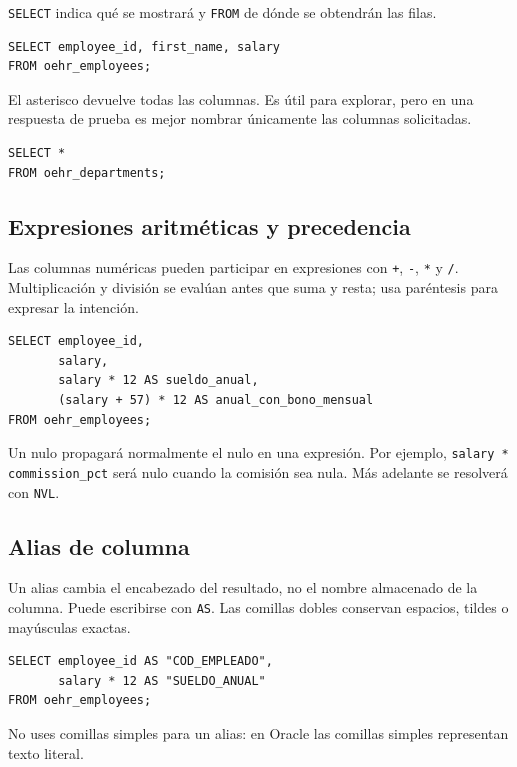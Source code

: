 \documentclass[11pt,a4paper]{article}
\newcommand{\campo}[1]{\texttt{#1}}
\begin{document}
\campo{SELECT} indica qué se mostrará y \campo{FROM} de dónde se obtendrán las filas.

\begin{lstlisting}
SELECT employee_id, first_name, salary
FROM oehr_employees;
\end{lstlisting}

El asterisco devuelve todas las columnas. Es útil para explorar, pero en una respuesta de prueba es
mejor nombrar únicamente las columnas solicitadas.

\begin{lstlisting}
SELECT *
FROM oehr_departments;
\end{lstlisting}

\subsection{Expresiones aritméticas y precedencia}

Las columnas numéricas pueden participar en expresiones con \campo{+}, \campo{-}, \campo{*} y
\campo{/}. Multiplicación y división se evalúan antes que suma y resta; usa paréntesis para expresar
la intención.

\begin{lstlisting}
SELECT employee_id,
       salary,
       salary * 12 AS sueldo_anual,
       (salary + 57) * 12 AS anual_con_bono_mensual
FROM oehr_employees;
\end{lstlisting}

Un nulo propagará normalmente el nulo en una expresión. Por ejemplo,
\campo{salary * commission\_pct} será nulo cuando la comisión sea nula. Más adelante se resolverá
con \campo{NVL}.

\subsection{Alias de columna}

Un alias cambia el encabezado del resultado, no el nombre almacenado de la columna. Puede escribirse
con \campo{AS}. Las comillas dobles conservan espacios, tildes o mayúsculas exactas.

\begin{lstlisting}
SELECT employee_id AS "COD_EMPLEADO",
       salary * 12 AS "SUELDO_ANUAL"
FROM oehr_employees;
\end{lstlisting}

No uses comillas simples para un alias: en Oracle las comillas simples representan texto literal.
\end{document}
